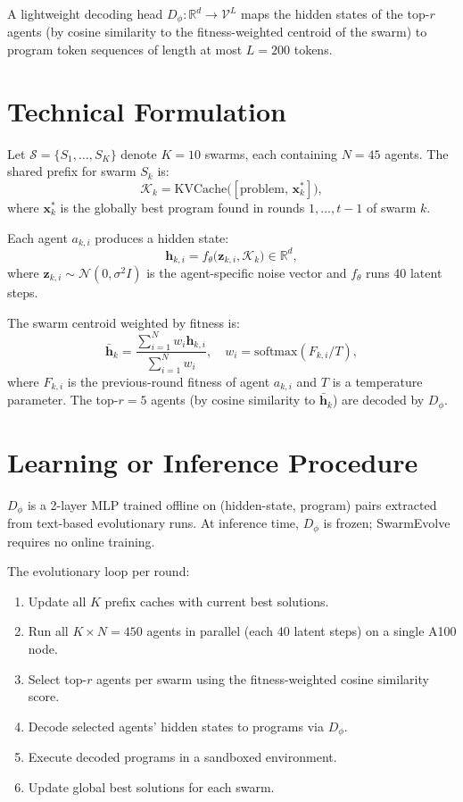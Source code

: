 \documentclass[10pt,twocolumn]{article}
\begin{document}
A lightweight decoding head $D_\phi: \mathbb{R}^d \to \mathcal{V}^L$
maps the hidden states of the top-$r$ agents (by cosine similarity to
the fitness-weighted centroid of the swarm) to program token sequences
of length at most $L = 200$ tokens.

\section{Technical Formulation}

Let $\mathcal{S} = \{S_1, \ldots, S_K\}$ denote $K = 10$ swarms, each
containing $N = 45$ agents. The shared prefix for swarm $S_k$ is:
\[
  \mathcal{K}_k = \text{KVCache}\bigl([\text{problem}, \,
    \mathbf{x}^*_k]\bigr),
\]
where $\mathbf{x}^*_k$ is the globally best program found in rounds
$1, \ldots, t-1$ of swarm $k$.

Each agent $a_{k,i}$ produces a hidden state:
\[
  \mathbf{h}_{k,i} = f_\theta\bigl(\mathbf{z}_{k,i},
    \mathcal{K}_k\bigr) \in \mathbb{R}^d,
\]
where $\mathbf{z}_{k,i} \sim \mathcal{N}(0, \sigma^2 I)$ is the
agent-specific noise vector and $f_\theta$ runs 40 latent steps.

The swarm centroid weighted by fitness is:
\[
  \bar{\mathbf{h}}_k = \frac{\sum_{i=1}^N w_i \mathbf{h}_{k,i}}
    {\sum_{i=1}^N w_i}, \quad
  w_i = \text{softmax}(F_{k,i} / T),
\]
where $F_{k,i}$ is the previous-round fitness of agent $a_{k,i}$ and
$T$ is a temperature parameter. The top-$r = 5$ agents (by cosine
similarity to $\bar{\mathbf{h}}_k$) are decoded by $D_\phi$.

\section{Learning or Inference Procedure}

$D_\phi$ is a 2-layer MLP trained offline on (hidden-state, program)
pairs extracted from text-based evolutionary runs. At inference time,
$D_\phi$ is frozen; SwarmEvolve requires no online training.

The evolutionary loop per round:
\begin{enumerate}[itemsep=2pt,parsep=0pt]
  \item Update all $K$ prefix caches with current best solutions.
  \item Run all $K \times N = 450$ agents in parallel (each 40 latent
    steps) on a single A100 node.
  \item Select top-$r$ agents per swarm using the fitness-weighted
    cosine similarity score.
  \item Decode selected agents' hidden states to programs via $D_\phi$.
  \item Execute decoded programs in a sandboxed environment.
  \item Update global best solutions for each swarm.
\end{enumerate}
\end{document}
